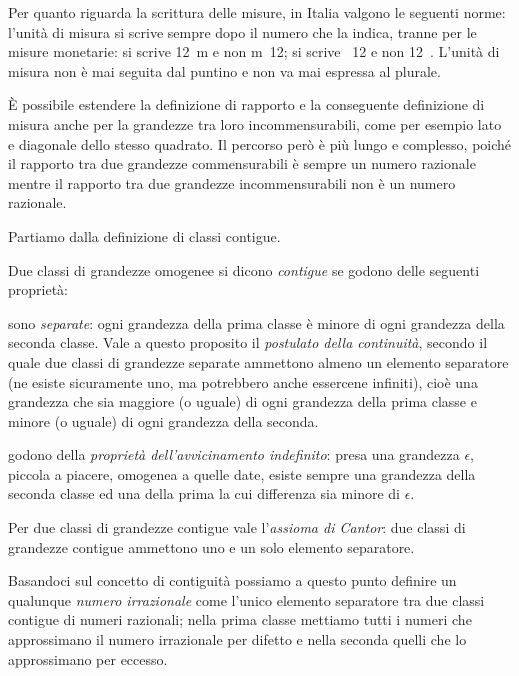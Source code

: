 Per quanto riguarda la scrittura delle misure, in Italia valgono le seguenti norme: l'unità di misura si scrive sempre dopo il numero che la indica, tranne per le misure monetarie: si scrive 12~m e non m~12; si scrive \officialeuro~12 e non 12~\officialeuro. L'unità di misura non è mai seguita dal puntino e non va mai espressa al plurale.

\`E possibile estendere la definizione di rapporto e la conseguente definizione di misura anche per la grandezze tra loro incommensurabili, come per esempio lato e diagonale dello stesso quadrato. Il percorso però è più lungo e complesso, poiché il rapporto tra due grandezze commensurabili è sempre un numero razionale mentre il rapporto tra due grandezze incommensurabili non è un numero razionale.

Partiamo dalla definizione di classi contigue.
\begin{definizione}
Due classi di grandezze omogenee si dicono \emph{contigue} se godono delle seguenti proprietà:
\begin{itemize*}
\item sono \emph{separate}: ogni grandezza della prima classe è minore di ogni grandezza della seconda classe. Vale a questo proposito il \emph{postulato della continuità}, secondo il quale due classi di grandezze separate ammettono almeno un elemento separatore (ne esiste sicuramente uno, ma potrebbero anche essercene infiniti), cioè una grandezza che sia maggiore (o uguale) di ogni grandezza della prima classe e minore (o uguale) di ogni grandezza della seconda.
\item godono della \emph{proprietà dell'avvicinamento indefinito}: presa una grandezza $\epsilon$, piccola a piacere, omogenea a quelle date, esiste sempre una grandezza della seconda classe ed una della prima la cui differenza sia minore di $\epsilon$.
\end{itemize*}
\end{definizione}

Per due classi di grandezze contigue vale l'\emph{assioma di Cantor}: due classi di grandezze contigue ammettono uno e un solo elemento separatore.

Basandoci sul concetto di contiguità possiamo a questo punto definire un qualunque \emph{numero irrazionale} come l'unico elemento separatore tra due classi contigue di numeri razionali; nella prima classe mettiamo tutti i numeri che approssimano il numero irrazionale per difetto e nella seconda quelli che lo approssimano per eccesso.

